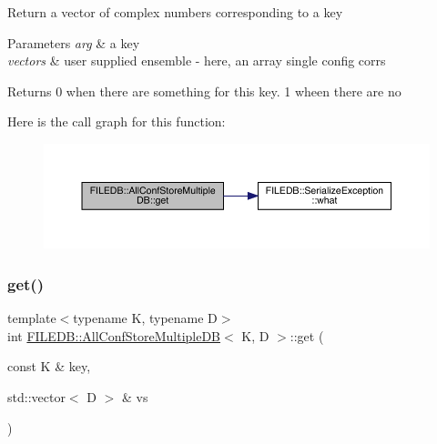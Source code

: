 Return a vector of complex numbers corresponding to a key 
\begin{DoxyParams}{Parameters}
{\em arg} & a key \\
\hline
{\em vectors} & user supplied ensemble -\/ here, an array single config corrs \\
\hline
\end{DoxyParams}
\begin{DoxyReturn}{Returns}
0 when there are something for this key. 1 wheen there are no 
\end{DoxyReturn}
Here is the call graph for this function\+:
\nopagebreak
\begin{figure}[H]
\begin{center}
\leavevmode
\includegraphics[width=350pt]{d5/dbe/classFILEDB_1_1AllConfStoreMultipleDB_a3a9858458bf0ecc76133e1c448568cf5_cgraph}
\end{center}
\end{figure}
\mbox{\label{classFILEDB_1_1AllConfStoreMultipleDB_a3a9858458bf0ecc76133e1c448568cf5}} 
\subsubsection{\texorpdfstring{get()}{get()}\hspace{0.1cm}{\footnotesize\ttfamily [2/2]}}
{\footnotesize\ttfamily template$<$typename K, typename D$>$ \\
int \mbox{\hyperlink{classFILEDB_1_1AllConfStoreMultipleDB}{F\+I\+L\+E\+D\+B\+::\+All\+Conf\+Store\+Multiple\+DB}}$<$ K, D $>$\+::get (\begin{DoxyParamCaption}\item[{const K \&}]{key,  }\item[{std\+::vector$<$ D $>$ \&}]{vs }\end{DoxyParamCaption})\hspace{0.3cm}{\ttfamily [inline]}}

